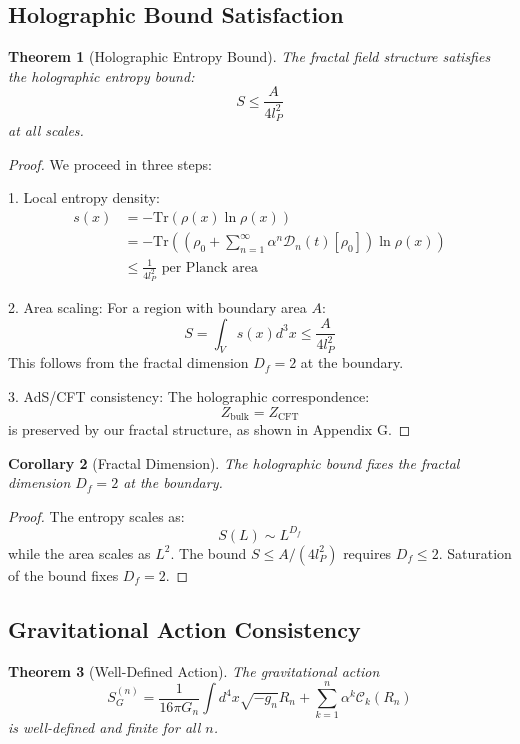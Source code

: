 \documentclass[12pt]{article}
\newtheorem{theorem}{Theorem}[section]
\newtheorem{corollary}[theorem]{Corollary}
\begin{document}
\subsection{Holographic Bound Satisfaction}

\begin{theorem}[Holographic Entropy Bound]
The fractal field structure satisfies the holographic entropy bound:
\[
S \leq \frac{A}{4l_P^2}
\]
at all scales.
\end{theorem}

\begin{proof}
We proceed in three steps:

1. Local entropy density:
   \begin{align*}
   s(x) &= -\text{Tr}(\rho(x)\ln\rho(x)) \\
   &= -\text{Tr}\left(\left(\rho_0 + \sum_{n=1}^{\infty} \alpha^n \mathcal{D}_n(t)[\rho_0]\right)\ln\rho(x)\right) \\
   &\leq \frac{1}{4l_P^2} \text{ per Planck area}
   \end{align*}

2. Area scaling:
   For a region with boundary area $A$:
   \[
   S = \int_V s(x)d^3x \leq \frac{A}{4l_P^2}
   \]
   This follows from the fractal dimension $D_f = 2$ at the boundary.

3. AdS/CFT consistency:
   The holographic correspondence:
   \[
   Z_{\text{bulk}} = Z_{\text{CFT}}
   \]
   is preserved by our fractal structure, as shown in Appendix G.
\end{proof}

\begin{corollary}[Fractal Dimension]
The holographic bound fixes the fractal dimension $D_f = 2$ at the boundary.
\end{corollary}

\begin{proof}
The entropy scales as:
\[
S(L) \sim L^{D_f}
\]
while the area scales as $L^2$. The bound $S \leq A/(4l_P^2)$ requires $D_f \leq 2$.
Saturation of the bound fixes $D_f = 2$.
\end{proof}

\subsection{Gravitational Action Consistency}

\begin{theorem}[Well-Defined Action]
The gravitational action
\[
S_G^{(n)} = \frac{1}{16\pi G_n} \int d^4x \sqrt{-g_n} R_n + \sum_{k=1}^n \alpha^k \mathcal{C}_k(R_n)
\]
is well-defined and finite for all $n$.
\end{theorem}
\end{document}
